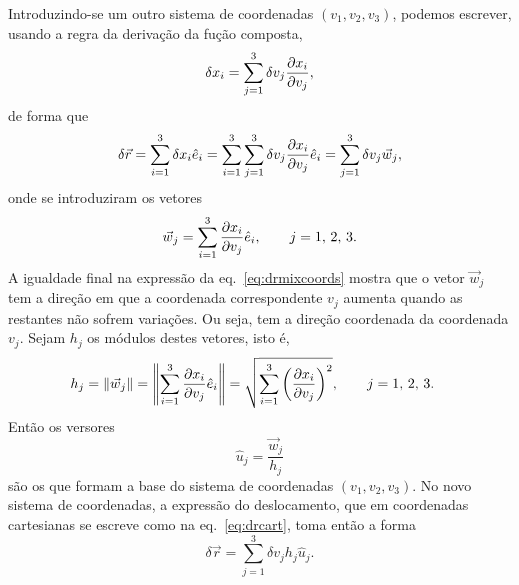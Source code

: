 Introduzindo-se um outro sistema de coordenadas $(v_1, v_2, v_3)$, podemos
escrever, usando a regra da derivação da fução composta,
\begin{equation*}
\delta x_i=\sum_{j=1}^3\delta v_j\frac{\partial x_i}{\partial v_j},
\end{equation*}
de forma que
\begin{equation}\label{eq:drmixcoords}
  \delta\vec r=\sum_{i=1}^3\delta x_i\he_i=\sum_{i=1}^3\sum_{j=1}^3\delta v_j
  \pd{x_i}{v_j}\he_i=\sum_{j=1}^3\delta v_j\vec w_j,
\end{equation}
onde se introduziram os vetores
\begin{equation*}
  \vec w_j=\sum_{i=1}^3\pd{x_i}{v_j}\he_i,\qquad j=1,\,2,\,3.
\end{equation*}
A igualdade final na expressão da eq.~\eqref{eq:drmixcoords} mostra que o vetor
$\vec w_j$ tem a direção em que a coordenada correspondente $v_j$ aumenta quando
as restantes não sofrem variações. Ou seja, tem a direção coordenada da
coordenada $v_j$. Sejam $h_j$ os módulos destes vetores, isto é,
\begin{align*}
  h_j&=\|\vec w_j\|=
  \left\|\sum_{i=1}^3\pd{x_i}{v_j}\he_i\right\|=
  \sqrt{\sum_{i=1}^3\left(\pd{x_i}{v_j}\right)^2},\qquad j=1,\,2,\,3.
\end{align*}
Então os versores
\begin{equation*}
  \hat u_j=\frac{\vec w_j}{h_j}
\end{equation*}
são os que formam a base do sistema de coordenadas $(v_1,v_2,v_3)$. No novo
sistema de coordenadas, a expressão do deslocamento, que em coordenadas
cartesianas se escreve como na eq.~\eqref{eq:drcart}, toma então a forma
\begin{equation}\label{eq:drncart}
  \delta\vec r = \sum_{j=1}^3\delta v_jh_j\hat u_j.
\end{equation}
